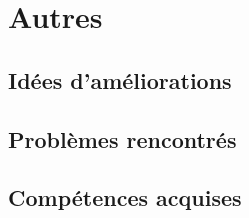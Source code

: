 \section{Autres}

\subsection{Idées d'améliorations}

\subsection{Problèmes rencontrés}

\subsection{Compétences acquises}